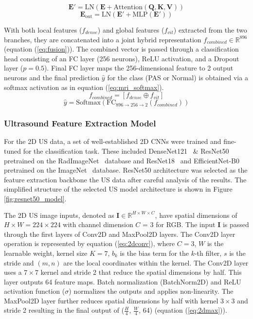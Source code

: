 \documentclass[12pt]{article}
\begin{document}
\begin{equation} \label{eq:mhsa}
\mathbf{E}' = \text{LN}\!\left(\mathbf{E} + \text{Attention}(\mathbf{Q}, \mathbf{K}, \mathbf{V})\right)
\end{equation}
\begin{equation} \label{eq:mlp}
\mathbf{E}_{\text{out}} = \text{LN}\!\left(\mathbf{E}' + \text{MLP}(\mathbf{E}') \right)
\end{equation}

With both local features ($f_{dense}$) and global features ($f_{vit}$) extracted from the two branches, they are concatenated into a joint hybrid representation $f_{combined} \in \mathbb{R}^{896}$ (equation (\ref{eq:fusion})). The combined vector is passed through a classification head consisting of an FC layer (256 neurons), ReLU activation, and a Dropout layer ($p=0.5$). Final FC layer maps the 256-dimensional feature to 2 output neurons and the final prediction $\hat{y}$ for the class (PAS or Normal) is obtained via a softmax activation as in equation (\ref{eq:mri_softmax}).
\begin{equation} \label{eq:fusion}
f_{combined} = [f_{dense} \oplus f_{vit}]
\end{equation}
\begin{equation} \label{eq:mri_softmax}
\hat{y} = \text{Softmax}(\text{FC}_{896 \to 256 \to 2}(f_{combined}))
\end{equation}

\subsubsection{Ultrasound Feature Extraction Model}

For the 2D US data, a set of well-established 2D CNNs were trained and fine-tuned for the classification task. These included DenseNet121~\cite{Huang_2017} \& ResNet50~\cite{He_2016} pretrained on the RadImageNet~\cite{Mei_2022} database and ResNet18~\cite{He_2016} and EfficientNet-B0~\cite{tan_2019} pretrained on the ImageNet~\cite{deng_2009} database. ResNet50 architecture was selected as the feature extraction backbone the US data after careful analysis of the results. The simplified structure of the selected US model architecture is shown in Figure \ref{fig:resnet50_model}.

The 2D US image inputs, denoted as $\mathbf{I} \in \mathbb{R}^{H \times W \times C}$, have spatial dimensions of $H \times W = 224 \times 224$ with channel dimension $C$ = 3 for RGB. The input $\mathbf{I}$ is passed through the first layers of Conv2D and MaxPool2D layers. The Conv2D layer operation is represented by equation (\ref{eq:2dconv}), where $C=3$, $W$ is the learnable weight, kernel size $K=7$, $b_k$ is the bias term for the $k$-th filter, $s$ is the stride and $(m, n)$ are the local coordinates within the kernel. The Conv2D layer uses a $7\times7$ kernel and stride 2 that reduce the spatial dimensions by half. This layer outputs 64 feature maps. Batch normalization (BatchNorm2D) and ReLU activation function ($\sigma$) normalizes the outputs and applies non-linearity. The MaxPool2D layer further reduces spatial dimensions by half with kernel $3 \times 3$ and stride 2 resulting in the final output of ($\frac{H}{4}$, $\frac{W}{4}$, 64) (equation (\ref{eq:2dmax})).
\end{document}
